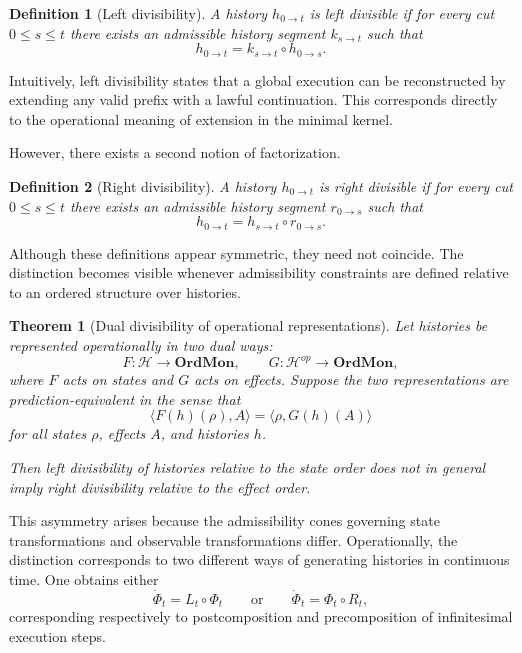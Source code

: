 \documentclass[12pt]{article}
\newtheorem{definition}{Definition}
\newtheorem{theorem}{Theorem}
\begin{document}
\begin{definition}[Left divisibility]
A history $h_{0\to t}$ is \emph{left divisible} if for every cut
$0 \le s \le t$ there exists an admissible history segment
$k_{s\to t}$ such that
\[
h_{0\to t} = k_{s\to t} \circ h_{0\to s}.
\]
\end{definition}

Intuitively, left divisibility states that a global execution can be
reconstructed by extending any valid prefix with a lawful continuation.
This corresponds directly to the operational meaning of extension in
the minimal kernel.

However, there exists a second notion of factorization.

\begin{definition}[Right divisibility]
A history $h_{0\to t}$ is \emph{right divisible} if for every cut
$0 \le s \le t$ there exists an admissible history segment
$r_{0\to s}$ such that
\[
h_{0\to t} = h_{s\to t} \circ r_{0\to s}.
\]
\end{definition}

Although these definitions appear symmetric, they need not coincide.
The distinction becomes visible whenever admissibility constraints are
defined relative to an ordered structure over histories.

\begin{theorem}[Dual divisibility of operational representations]
Let histories be represented operationally in two dual ways:
\[
F : \mathcal{H} \to \mathbf{OrdMon}, \qquad
G : \mathcal{H}^{op} \to \mathbf{OrdMon},
\]
where $F$ acts on states and $G$ acts on effects. Suppose the two
representations are prediction-equivalent in the sense that
\[
\langle F(h)(\rho),A\rangle = \langle \rho,G(h)(A)\rangle
\]
for all states $\rho$, effects $A$, and histories $h$.

Then left divisibility of histories relative to the state order does
not in general imply right divisibility relative to the effect order.
\end{theorem}

This asymmetry arises because the admissibility cones governing
state transformations and observable transformations differ.
Operationally, the distinction corresponds to two different ways of
generating histories in continuous time. One obtains either
\[
\dot{\Phi}_t = L_t \circ \Phi_t
\qquad \text{or} \qquad
\dot{\Phi}_t = \Phi_t \circ R_t,
\]
corresponding respectively to postcomposition and precomposition
of infinitesimal execution steps.
\end{document}
